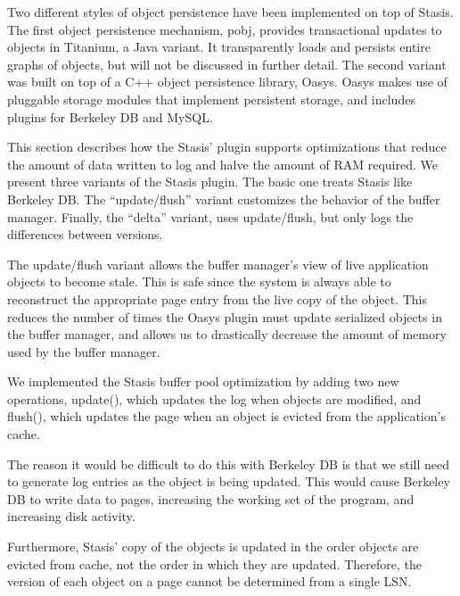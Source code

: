 \documentclass[letterpaper,twocolumn,10pt]{article}
\newcommand{\yad}{Stasis\xspace}
\newcommand{\yads}{Stasis'\xspace}
\newcommand{\oasys}{Oasys\xspace}
\begin{document}
Two different styles of object persistence have been implemented
on top of \yad.
%
The first object persistence mechanism, pobj, provides transactional updates to objects in
Titanium, a Java variant.  It transparently loads and persists
entire graphs of objects, but will not be discussed in further detail.
The second variant was built on top of a C++ object
persistence library, \oasys.  \oasys makes use of pluggable storage
modules that implement persistent storage, and includes plugins
for Berkeley DB and MySQL.  

This section describes how the \yads plugin supports optimizations that reduce the
amount of data written to log and halve the amount of RAM required.
We present three variants of the \yad plugin.  The basic one treats
\yad like Berkeley DB.  The ``update/flush'' variant
customizes the behavior of the buffer manager. Finally, the 
``delta'' variant, uses update/flush, but only logs the differences
between versions.

The update/flush variant allows the buffer manager's view of live
application objects to become stale.  This is safe since the system is
always able to reconstruct the appropriate page entry from the live
copy of the object.  This reduces the number of times the \oasys
plugin must update serialized objects in the buffer manager, and
allows us to drastically decrease the amount of memory used by the
buffer manager.  

We implemented the \yad buffer pool optimization by adding two new
operations, update(), which updates the log when objects are modified, and flush(), which
updates the page when an object is evicted from the application's cache.  

The reason it would be difficult to do this with Berkeley DB is that
we still need to generate log entries as the object is being updated.
  This would cause Berkeley DB to write data to pages,
increasing the working set of the program, and increasing disk
activity.

Furthermore, \yads copy of the objects is updated in the order objects
are evicted from cache, not the order in which they are updated.
Therefore, the version of each object on a page cannot be determined
from a single LSN.
\end{document}
